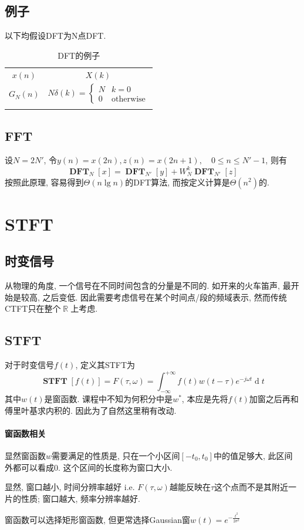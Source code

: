 \documentclass{ctexart}
\DeclareMathOperator{\DFT}{\mathbf{DFT}}
\DeclareMathOperator{\ud}{\mathrm{d}}
\DeclareMathOperator{\Rset}{\mathbb{R}}
\DeclareMathOperator{\STFT}{\mathbf{STFT}}
\newlength{\Oldarrayrulewidth}
\newcommand{\Hline}[1]{
  \noalign{\global\setlength{\Oldarrayrulewidth}{\arrayrulewidth}}
  \noalign{\global\setlength{\arrayrulewidth}{#1}}\hline
  \noalign{\global\setlength{\arrayrulewidth}{\Oldarrayrulewidth}}}
\newcommand{\Topline}{\Hline{0.08em}}
\newcommand{\Bottomline}{\Hline{0.08em}}
\newcommand{\Midline}{\Hline{0.05em}}
\begin{document}
\subsection{例子}
    以下均假设DFT为N点DFT.
    \begin{table}[ht!]
    \centering
    \begin{tabularx}{\textwidth}{|CC|}
            \Topline $\displaystyle x(n)$ & $\displaystyle X(k)$ \\ \Midline
            $\displaystyle G_N(n)$ & $\displaystyle N\delta(k) = \begin{cases} N & k = 0\\ 0 & \text{otherwise}\end{cases}$
            \\
            \Bottomline
    \end{tabularx}
    \caption{DFT的例子}
    \end{table}

\subsection{FFT}
    设$N = 2N'$, 令$y(n) = x(2n), z(n) = x(2n+1),\quad 0 \le n \le N' - 1$, 则有\[
        \DFT_{N} [x] = \DFT_{N'} [y] + W_N^k \DFT_{N'} [z] \]
    按照此原理, 容易得到$\Theta(n \lg n)$的DFT算法, 而按定义计算是$\Theta(n^2)$的.

\section{STFT}
\subsection{时变信号} 从物理的角度, 一个信号在不同时间包含的分量是不同的.
    如开来的火车笛声, 最开始是较高, 之后变低.
    因此需要考虑信号在某个时间点/段的频域表示, 然而传统CTFT只在整个$\Rset$上考虑.
\subsection{STFT}
    对于时变信号$f(t)$, 定义其STFT为\[
        \STFT[f(t)] = F(\tau, \omega) = \int_{-\infty}^{+\infty} f(t) w(t - \tau) e^{-j\omega t} \ud t\]
    其中$w(t)$是窗函数.
    课程中不知为何积分中是$w^*$, 本应是先将$f(t)$加窗之后再和傅里叶基求内积的.
    因此为了自然这里稍有改动.
\paragraph{窗函数相关} 显然窗函数$w$需要满足的性质是,
    只在一个小区间$[-t_0, t_0]$中的值足够大, 此区间外都可以看成$0$.
    这个区间的长度称为窗口大小.\par
    显然, 窗口越小, 时间分辨率越好 i.e. $F(\tau, \omega)$越能反映在$\tau$这个点而不是其附近一片的性质;
    窗口越大, 频率分辨率越好.\par
    窗函数可以选择矩形窗函数, 但更常选择Gaussian窗$w(t) = e^{-\frac{t^2}{2 \sigma^2}}$
\end{document}
